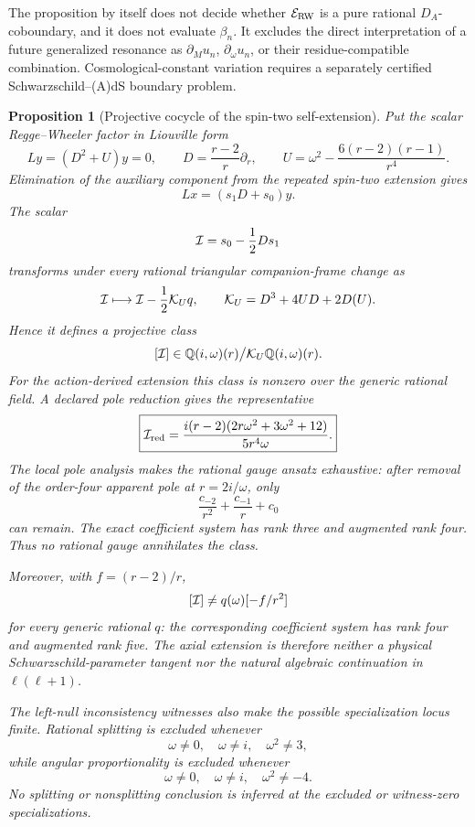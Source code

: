 \documentclass[11pt]{article}
\newtheorem{proposition}[theorem]{Proposition}
\theoremstyle{definition}
\theoremstyle{remark}
\begin{document}
The proposition by itself does not decide whether \(\mathcal E_{\rm RW}\)
is a pure rational \(D_A\)-coboundary, and it does not evaluate
\(\beta_n\).  It excludes the direct interpretation of a future generalized
resonance as \(\partial_Mu_n\), \(\partial_\omega u_n\), or their
residue-compatible combination.  Cosmological-constant variation requires a
separately certified Schwarzschild--(A)dS boundary problem.

\begin{proposition}[Projective cocycle of the spin-two self-extension]
\label{prop:axial-qnm-projective-cocycle}
Put the scalar Regge--Wheeler factor in Liouville form
\[
 Ly=(D^2+U)y=0,\qquad
 D=\frac{r-2}{r}\partial_r,\qquad
 U=\omega^2-\frac{6(r-2)(r-1)}{r^4}.
\]
Elimination of the auxiliary component from the repeated spin-two
extension gives
\[
 Lx=(s_1D+s_0)y.
\]
The scalar
\[
 {\cal I}=s_0-\frac12Ds_1
\]
transforms under every rational triangular companion-frame change as
\[
 {\cal I}\longmapsto {\cal I}-\frac12{\cal K}_Uq,\qquad
 {\cal K}_U=D^3+4UD+2D(U).
\]
Hence it defines a projective class
\[
 [{\cal I}]\in
 \mathbb Q(i,\omega)(r)\big/{\cal K}_U\mathbb Q(i,\omega)(r).
\]
For the action-derived extension this class is nonzero over the generic
rational field.  A declared pole reduction gives the representative
\[
 \boxed{
 {\cal I}_{\rm red}
 =\frac{i(r-2)(2r\omega^2+3\omega^2+12)}
 {5r^4\omega}.}
\]
The local pole analysis makes the rational gauge ansatz exhaustive:
after removal of the order-four apparent pole at \(r=2i/\omega\), only
\[
 \frac{c_{-2}}{r^2}+\frac{c_{-1}}r+c_0
\]
can remain.  The exact coefficient system has rank three and augmented
rank four.  Thus no rational gauge annihilates the class.

Moreover, with \(f=(r-2)/r\),
\[
 [{\cal I}]\ne q(\omega)[-f/r^2]
\]
for every generic rational \(q\): the corresponding coefficient system
has rank four and augmented rank five.  The axial extension is therefore
neither a physical Schwarzschild-parameter tangent nor the natural
algebraic continuation in \(\ell(\ell+1)\).

The left-null inconsistency witnesses also make the possible specialization
locus finite.  Rational splitting is excluded whenever
\[
 \omega\ne0,\quad \omega\ne i,\quad \omega^2\ne3,
\]
while angular proportionality is excluded whenever
\[
 \omega\ne0,\quad \omega\ne i,\quad \omega^2\ne-4.
\]
No splitting or nonsplitting conclusion is inferred at the excluded or
witness-zero specializations.
\end{proposition}
\end{document}
